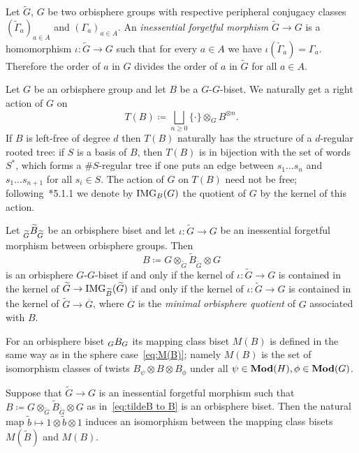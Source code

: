\documentclass{amsart}
\begin{document}
Let $\widetilde G$, $G$ be two orbisphere groups with respective
peripheral conjugacy classes $(\widetilde\Gamma_a)_{a\in A}$ and
$(\Gamma_a)_{a\in A}$. An \emph{inessential forgetful morphism}
$\widetilde G\to G$ is a homomorphism
$\iota \colon \widetilde G\to G$ such that for every $a\in A$ we have
$\iota(\widetilde\Gamma_a)=\Gamma_a$.  Therefore the order of $a$ in
$G$ divides the order of $a$ in $\widetilde G$ for all
$a\in A$.

Let $G$ be an orbisphere group and let $B$ be a $G$-$G$-biset. We
naturally get a right action of $G$ on
\[T(B)\coloneqq\bigsqcup_{n\ge0}\{\cdot\}\otimes_G B^{\otimes n}.
\]
If $B$ is left-free of degree $d$ then $T(B)$ naturally has the
structure of a $d$-regular rooted tree: if $S$ is a basis of $B$, then
$T(B)$ is in bijection with the set of words $S^*$, which forms a
$\#S$-regular tree if one puts an edge between $s_1\dots s_n$ and
$s_1\dots s_{n+1}$ for all $s_i\in S$. The action of $G$ on $T(B)$
need not be free; following~\cite{nekrashevych:ssg}*{5.1.1} we denote
by $\operatorname{IMG}_B(G)$ the quotient of $G$ by the kernel of this action.


\begin{lem}
  Let $\subscript{\widetilde G}{\widetilde B}_{\widetilde G}$ be an
  orbisphere biset and let $\iota\colon \widetilde G\to G$ be an
  inessential forgetful morphism between orbisphere groups. Then
  \begin{equation}\label{eq:tildeB to B}
    B\coloneqq G\otimes_{\widetilde G}\widetilde B_{\widetilde G}\otimes G
  \end{equation}
  is an orbisphere $G$-$G$-biset if and only if the kernel of
  $\iota\colon\widetilde G\to G$ is contained in the kernel of
  $\widetilde G\to\operatorname{IMG}_{\widetilde B}(\widetilde G)$ if and only if
  the kernel of $\iota\colon\widetilde G\to G$ is contained in the
  kernel of $\widetilde G\to \overline G$, where $\overline G$ is the
  \emph{minimal orbisphere quotient} of $G$ associated with $B$.
\end{lem}

For an orbisphere biset $\subscript GB_G$ its mapping class biset
$M(B)$ is defined in the same way as in the sphere
case~\eqref{eq:M(B)}; namely $M(B)$ is the set of isomorphism classes
of twists $B_\psi\otimes B\otimes B_\phi$ under all
$\psi\in\mathbf{\relax Mod}(H),\phi\in\mathbf{\relax Mod}(G)$.

\begin{thm}
  Suppose that $\widetilde G\to G$ is an inessential forgetful
  morphism such that
  $B\coloneqq G\otimes_{\widetilde G}\widetilde B_{\widetilde
    G}\otimes G$ as in~\eqref{eq:tildeB to B} is an orbisphere biset.
  Then the natural map
  $\widetilde b\mapsto 1\otimes\widetilde b\otimes 1$ induces an
  isomorphism between the mapping class bisets $M(\widetilde B)$ and
  $M(B)$.
\end{thm}
\end{document}
